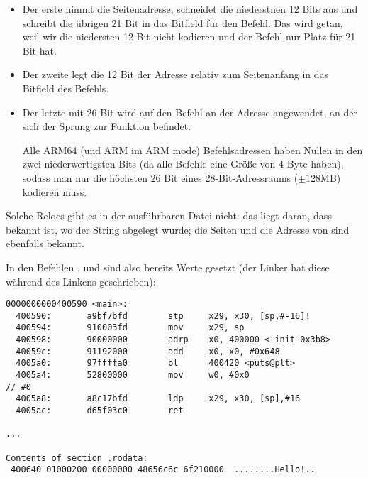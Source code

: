 \begin{itemize}
\item 
Der erste nimmt die Seitenadresse, schneidet die niederstnen 12 Bits aus und schreibt die übrigen 21 Bit in das
Bitfield für den  Befehl. Das wird getan, weil wir die niedersten 12 Bit nicht kodieren und der Befehl
 nur Platz für 21 Bit hat.

\item 
Der zweite legt die 12 Bit der Adresse relativ zum Seitenanfang in das Bitfield des \ADD Befehls.

\item 
Der letzte mit 26 Bit wird auf den Befehl an der Adresse  angewendet, an der sich der Sprung zur Funktion
\printf befindet.

Alle ARM64 (und ARM im ARM mode) Befehlsadressen haben Nullen in den zwei niederwertigsten Bits (da alle Befehle eine
Größe von 4 Byte haben), sodass man nur die höchsten 26 Bit eines 28-Bit-Adressraums ($\pm 128$MB) kodieren muss.

\end{itemize}
Solche Relocs gibt es in der ausführbaren Datei nicht: das liegt daran, dass bekannt ist, wo der  String
abgelegt wurde; die Seiten und die Adresse von \puts sind ebenfalls bekannt.

In den Befehlen , \ADD und  sind also bereits Werte gesetzt (der Linker hat diese während des Linkens
geschrieben):

\begin{lstlisting}[caption=objdump der ausführbaren Datei,style=customasmARM]
0000000000400590 <main>:
  400590:       a9bf7bfd        stp     x29, x30, [sp,#-16]!
  400594:       910003fd        mov     x29, sp
  400598:       90000000        adrp    x0, 400000 <_init-0x3b8>
  40059c:       91192000        add     x0, x0, #0x648
  4005a0:       97ffffa0        bl      400420 <puts@plt>
  4005a4:       52800000        mov     w0, #0x0                        // #0
  4005a8:       a8c17bfd        ldp     x29, x30, [sp],#16
  4005ac:       d65f03c0        ret

...

Contents of section .rodata:
 400640 01000200 00000000 48656c6c 6f210000  ........Hello!..
\end{lstlisting}

